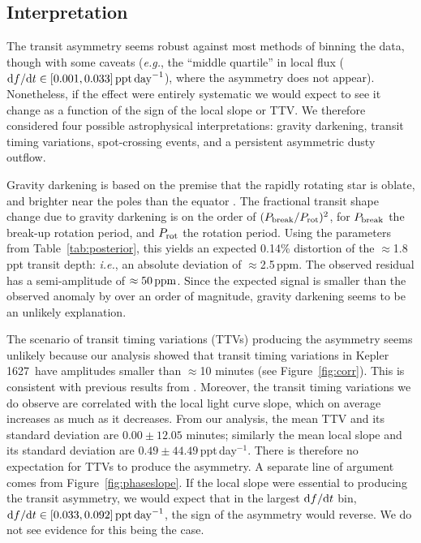 \documentclass[12pt,modern,twocolumn,tighten]{aastex63}
\newcommand{\sn}{Kepler\,1627} %
\begin{document}

\subsection{Interpretation}

The transit asymmetry seems robust against most methods of binning the
data, though with some caveats ({\it e.g.}, the ``middle quartile'' in
local flux (${\rm d}f/{\rm d}t\in[0.001,0.033]\,{\rm ppt\,day}^{-1}$),
where the asymmetry does not appear).  Nonetheless, if the effect were
entirely systematic we would expect to see it change as a function of
the sign of the local slope or TTV.  We therefore considered four
possible astrophysical interpretations: gravity darkening, transit
timing variations, spot-crossing events, and a persistent asymmetric
dusty outflow.  

Gravity darkening is based on the premise that the rapidly rotating
star is oblate, and brighter near the poles than the equator
\citep[{\it e.g.},][]{masuda_spin-orbit_2015}.  The fractional transit
shape change due to gravity darkening is on the order of $(P_{\rm
break}/P_{\rm rot})^2$, for $P_{\rm break}$ the break-up rotation
period, and $P_{\rm rot}$ the rotation period.  Using the parameters
from Table~\ref{tab:posterior}, this yields an expected 0.14\%
distortion of the $\approx$1.8\,ppt transit depth: {\it i.e.}, an
absolute deviation of $\approx$2.5\,ppm.  The observed residual has a
semi-amplitude of $\approx 50\,{\rm ppm}$.  Since the expected signal
is smaller than the observed anomaly by over an order of magnitude,
gravity darkening seems to be an unlikely explanation.

The scenario of transit timing variations (TTVs) producing the
asymmetry seems unlikely because our analysis showed that transit
timing variations in \sn\ have amplitudes smaller than $\approx$10
minutes (see Figure~\ref{fig:corr}).  This is consistent with previous
results from \citet{holczer_transit_2016}.  Moreover, the transit
timing variations we do observe are correlated with the local light
curve slope, which on average increases as much as it decreases.  From
our analysis, the mean TTV and its standard deviation are
$0.00\pm12.05$ minutes; similarly the mean local slope and its
standard deviation are $0.49\pm44.49$\,ppt\,day$^{-1}$.  There is
therefore no expectation for TTVs to produce the asymmetry.  A
separate line of argument comes from Figure~\ref{fig:phaseslope}.  If
the local slope were essential to producing the transit asymmetry, we
would expect that in the largest ${\rm d}f/{\rm d}t$ bin, ${\rm
d}f/{\rm d}t\in[0.033,0.092]\,{\rm ppt\,day}^{-1}$, the sign of the
asymmetry would reverse.  We do not see evidence for this being the
case.
\end{document}
